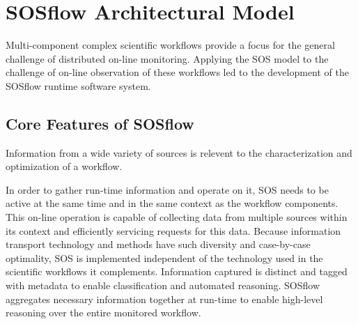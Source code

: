
\section{SOSflow Architectural Model}
%
%
Multi-component complex scientific workflows provide a focus for the
general challenge of distributed on-line monitoring.
%
Applying the SOS model to the challenge of on-line observation of
these workflows led to the development of the SOSflow runtime software
system.
%
\subsection{Core Features of SOSflow}
%
%
%
%
%
%
%
%
%
Information from a wide variety of sources is relevent to the
characterization and optimization of a workflow.
%
\par
%
In order to gather run-time information and operate on it, SOS needs
to be active at the same time and in the same context as the workflow
components.
%
This on-line operation is capable of collecting data from multiple
sources within its context and efficiently servicing requests
for this data.
%
Because information transport technology and methods have such
diversity and case-by-case optimality, SOS is implemented
independent of the technology used in the scientific workflows it
complements.
%
Information captured is distinct and tagged with metadata to enable
classification and automated reasoning.
%
SOSflow aggregates necessary information together at run-time to
enable high-level reasoning over the entire monitored workflow.
%
%
%
